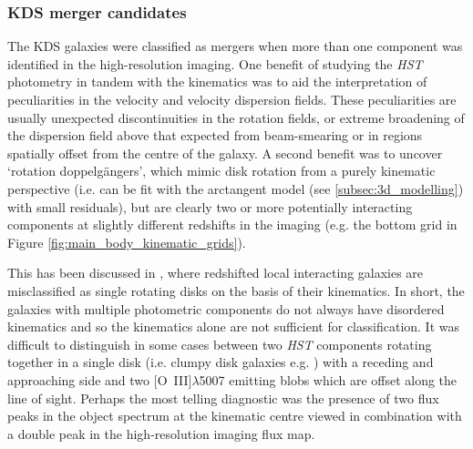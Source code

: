 \documentclass[fleqn,usenatbib]{mnras}
\begin{document}
\subsubsection{KDS merger candidates}\label{subsubsection:merger_candidates}
The KDS galaxies were classified as mergers when more than one component was identified in the high-resolution imaging.  
One benefit of studying the {\em HST} photometry in tandem with the kinematics was to aid the interpretation of peculiarities in the velocity and velocity dispersion fields.
These peculiarities are usually unexpected discontinuities in the rotation fields, or extreme broadening of the dispersion field above that expected from beam-smearing or in regions spatially offset from the centre of the galaxy.
A second benefit was to uncover `rotation doppelg{\"a}ngers', which mimic disk rotation from a purely kinematic perspective (i.e. can be fit with the arctangent model (see \cref{subsec:3d_modelling}) with small residuals), but are clearly two or more potentially interacting components at slightly different redshifts in the imaging (e.g. the bottom grid in Figure \ref{fig:main_body_kinematic_grids}).

This has been discussed in \cite{Hung2015}, where redshifted local interacting galaxies are misclassified as single rotating disks on the basis of their kinematics. 
In short, the galaxies with multiple photometric components do not always have disordered kinematics and so the kinematics alone are not sufficient for classification.
It was difficult to distinguish in some cases between two {\em HST} components rotating together in a single disk (i.e. clumpy disk galaxies e.g. \citealt{Elmegreen2004,Bournaud2007}) with a receding and approaching side and two [O~{\sc III}]$\lambda$5007 emitting blobs which are offset along the line of sight.
Perhaps the most telling diagnostic was the presence of two flux peaks in the object spectrum at the kinematic centre viewed in combination with a double peak in the high-resolution imaging flux map. \\
\end{document}
